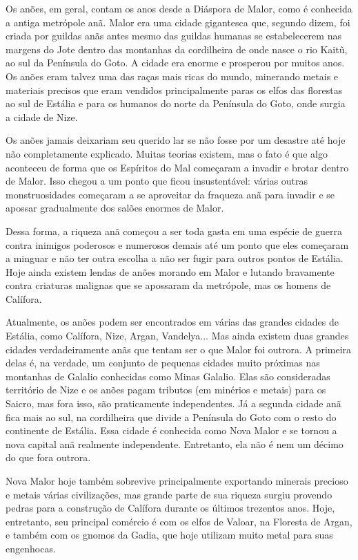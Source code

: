 \documentclass{RPG_Adventure}[2021/10/20]
\begin{document}
\begin{multicols}{2}
Os anões, em geral, contam os anos desde a Diáspora de Malor, como é conhecida a
antiga metrópole anã. Malor era uma cidade gigantesca que, segundo dizem, foi
criada por guildas anãs antes mesmo das guildas humanas se estabelecerem nas
margens do Jote dentro das montanhas da cordilheira de onde nasce o rio Kaitû,
ao sul da Península do Goto. A cidade era enorme e prosperou por muitos anos. Os
anões eram talvez uma das raças mais ricas do mundo, minerando metais e
materiais precisos que eram vendidos principalmente paras os elfos das florestas
ao sul de Estália e para os humanos do norte da Península do Goto, onde surgia a
cidade de Nize.

Os anões jamais deixariam seu querido lar se não fosse por um desastre até hoje
não completamente explicado. Muitas teorias existem, mas o fato é que algo
aconteceu de forma que os Espíritos do Mal começaram a invadir e brotar dentro
de Malor. Isso chegou a um ponto que ficou insustentável: várias outras
monstruosidades começaram a se aproveitar da fraqueza anã para invadir e se
apossar gradualmente dos salões enormes de Malor.

Dessa forma, a riqueza anã começou a ser toda gasta em uma espécie de guerra
contra inimigos poderosos e numerosos demais até um ponto que eles começaram a
minguar e não ter outra escolha a não ser fugir para outros pontos de Estália.
Hoje ainda existem lendas de anões morando em Malor e lutando bravamente contra
criaturas malignas que se apossaram da metrópole, mas os homens de Calífora.

Atualmente, os anões podem ser encontrados em várias das grandes cidades de
Estália, como Calífora, Nize, Argan, Vandelya... Mas ainda existem duas grandes
cidades verdadeiramente anãs que tentam ser o que Malor foi outrora. A primeira
delas é, na verdade, um conjunto de pequenas cidades muito próximas nas
montanhas de Galalio conhecidas como Minas Galalio. Elas são consideradas
território de Nize e os anões pagam tributos (em minérios e metais) para os
Saicro, mas fora isso, são praticamente independentes. Já a segunda cidade anã
fica mais ao sul, na cordilheira que divide a Península do Goto com o resto do
continente de Estália. Essa cidade é conhecida como Nova Malor e se tornou a
nova capital anã realmente independente. Entretanto, ela não é nem um décimo do
que fora outrora.

Nova Malor hoje também sobrevive principalmente exportando minerais precioso e
metais várias civilizações, mas grande parte de sua riqueza surgiu provendo
pedras para a construção de Calífora durante os últimos trezentos anos. Hoje,
entretanto, seu principal comércio é com os elfos de Valoar, na Floresta de
Argan, e também com os gnomos da Gadia, que hoje utilizam muito metal para suas
engenhocas.


\end{multicols}
\end{document}
